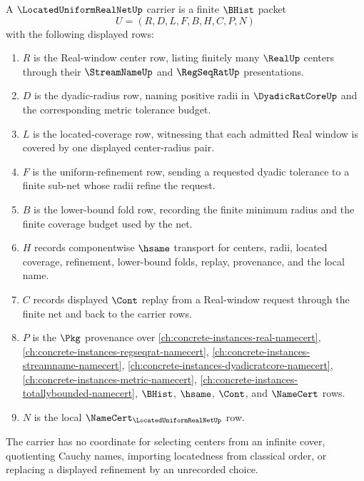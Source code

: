 \begin{definition}
\label{def:located-uniform-real-net-carrier}
A $\LocatedUniformRealNetUp$ carrier is a finite $\BHist$ packet
$$
U=(R,D,L,F,B,H,C,P,N)
$$
with the following displayed rows:
\begin{enumerate}
\item $R$ is the Real-window center row, listing finitely many $\RealUp$ centers through their $\StreamNameUp$ and $\RegSeqRatUp$ presentations.
\item $D$ is the dyadic-radius row, naming positive radii in $\DyadicRatCoreUp$ and the corresponding metric tolerance budget.
\item $L$ is the located-coverage row, witnessing that each admitted Real window is covered by one displayed center-radius pair.
\item $F$ is the uniform-refinement row, sending a requested dyadic tolerance to a finite sub-net whose radii refine the request.
\item $B$ is the lower-bound fold row, recording the finite minimum radius and the finite coverage budget used by the net.
\item $H$ records componentwise $\hsame$ transport for centers, radii, located coverage, refinement, lower-bound folds, replay, provenance, and the local name.
\item $C$ records displayed $\Cont$ replay from a Real-window request through the finite net and back to the carrier rows.
\item $P$ is the $\Pkg$ provenance over \autoref{ch:concrete-instances-real-namecert}, \autoref{ch:concrete-instances-regseqrat-namecert}, \autoref{ch:concrete-instances-streamname-namecert}, \autoref{ch:concrete-instances-dyadicratcore-namecert}, \autoref{ch:concrete-instances-metric-namecert}, \autoref{ch:concrete-instances-totallybounded-namecert}, $\BHist$, $\hsame$, $\Cont$, and $\NameCert$ rows.
\item $N$ is the local $\NameCert_{\LocatedUniformRealNetUp}$ row.
\end{enumerate}
The carrier has no coordinate for selecting centers from an infinite cover, quotienting Cauchy names, importing locatedness from classical order, or replacing a displayed refinement by an unrecorded choice.
\end{definition}

